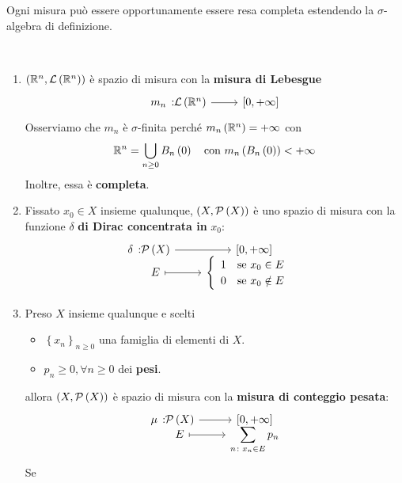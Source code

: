 \begin{observe}
	Ogni misura può essere opportunamente essere resa completa estendendo la $\sigma$-algebra di definizione.
\end{observe}
\begin{exampleswt}~{}
	\begin{enumerate}
		\item $\left(\mathbb{R}^n,\mathcal{L}\left(\mathbb{R}^n\right)\right)$ è spazio di misura con la \textbf{misura di Lebesgue}
		\begin{equation}
			\funz{m_n}{\mathcal{L}\left(\realset^n\right)}{\left[0,+\infty\right]}
		\end{equation}
		Osserviamo che $m_n$ è $\sigma$-finita perché $m_n\left(\mathbb{R}^n\right)=+\infty$ con
		\begin{equation*}
			\mathbb{R}^n=\bigcup_{n\geq 0}B_n\left(0\right)\quad\text{con }m_n\left(B_n\left(0\right)\right)<+\infty
		\end{equation*}
		Inoltre, essa è \textbf{completa}. %
		\item Fissato $x_0\in X$ insieme qualunque, $\left(X,\mathcal{P}\left(X\right)\right)$ è uno spazio di misura con la funzione $\delta$ \textbf{di Dirac concentrata in} $x_0$:
		\begin{equation}
			\funztot{\delta}{\setpart{X}}{\left[0,+\infty\right]}{E}{\begin{cases}
					\begin{array}{ll}
						1&\text{se }x_0\in E\\
						0&\text{se }x_0\notin E
					\end{array}
			\end{cases}}
		\end{equation}
		\item Preso $X$ insieme qualunque e scelti
		\begin{itemize}
			\item $\left\{x_n\right\}_{n\geq 0}$ una famiglia di elementi di $X$.
			\item $p_n\geq 0, \forall n\geq 0$ dei \textbf{pesi}.
		\end{itemize}
	allora $\left(X,\mathcal{P}\left(X\right)\right)$ è spazio di misura con la \textbf{misura di conteggio pesata}:
	\begin{equation}
		\funztot{\mu}{\setpart{X}}{\left[0,+\infty\right]}{E}{\displaystyle\sum_{n\colon x_n\in E}p_n}
	\end{equation}
Se
\begin{equation*}

\end{equation*}
\end{enumerate}
\end{exampleswt}
